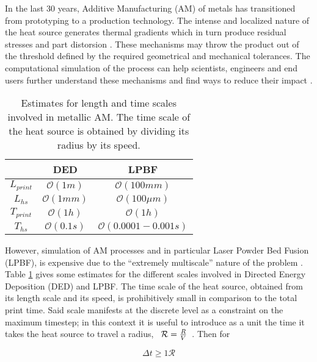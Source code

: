 In the last 30 years, Additive Manufacturing (AM) of metals has transitioned from
prototyping to a production technology. The intense and localized nature of the
heat source generates thermal gradients which in turn produce residual stresses
and part distorsion \citep{Fu2014}.
These mechanisms may throw the product out of the threshold defined by
the required geometrical and mechanical tolerances.
The computational simulation of the process can help
scientists, engineers and end users further understand these mechanisms
and find ways to reduce their impact \citep{Lu2022}.\par

\begin{table}[h]
  \centering
  \begin{tabular}{|c|c|c|}
    \hline
    & DED & LPBF \\
    \hline
    $L_{print}$ & $\mathcal{O}(1 m   )$ &  $\mathcal{O}(100 mm    )$  \\
    $L_{hs}$    & $\mathcal{O}(1 mm  )$ &  $\mathcal{O}(100 \mu m)$  \\
    $T_{print}$ & $\mathcal{O}(1 h   )$ &  $\mathcal{O}(1 h       )$  \\
    $T_{hs}$    & $\mathcal{O}(0.1 s )$ &  $\mathcal{O}(0.0001-0.001 s  )$  \\
    \hline
  \end{tabular}
  \caption{Estimates for length and time scales involved in metallic AM. The time
  scale of the heat source is obtained by dividing its radius by its
  speed.}
  \label{tbl:scales}
\end{table}

However, simulation of AM processes and in particular Laser Powder Bed Fusion (LPBF), is
expensive due to the ``extremely multiscale'' nature
of the problem \citep{Hodge2021}.
Table \ref{tbl:scales}
gives some estimates for the different scales involved in Directed Energy Deposition (DED) and LPBF.
The time scale of the heat source, obtained from its length scale and its speed,
is prohibitively small in comparison to the total print time.
Said scale manifests at the discrete level
as a constraint on the maximum timestep; in this context
it is useful to introduce as a unit
the time it takes the heat source to travel a radius,
$\enskip \mathcal{R} = \frac{R}{V} \enskip$. Then for

\begin{equation}\label{eq:origconstraint}
  \Delta t \geq 1 \mathcal{R}
\end{equation}

